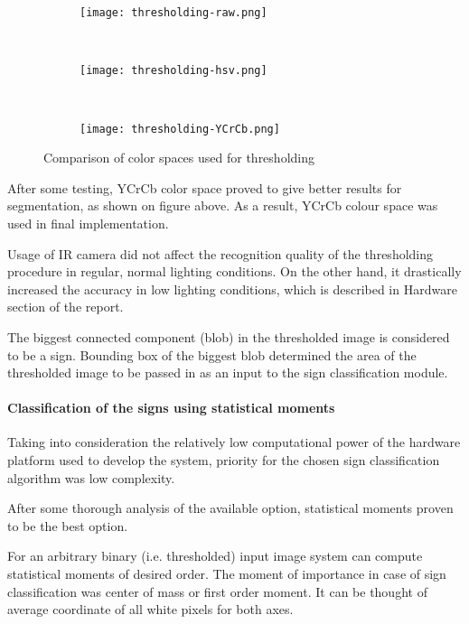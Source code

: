 \begin{figure}[th!]
	\centering
	\begin{subfigure}[b]{0.3\textwidth}
		\centering
		\texttt{[image: thresholding-raw.png]}
	\end{subfigure}
	~
	\begin{subfigure}[b]{0.3\textwidth}
		\centering
		\texttt{[image: thresholding-hsv.png]}
	\end{subfigure}
	~
	\begin{subfigure}[b]{0.3\textwidth}
		\centering
		\texttt{[image: thresholding-YCrCb.png]}
	\end{subfigure}
	\caption{Comparison of color spaces used for thresholding}
	\label{fig:color-spaces}
\end{figure}


After some testing, YCrCb color space proved to give better results for segmentation, as shown on figure above. As a result, YCrCb colour space was used in final implementation.

Usage of IR camera did not affect the recognition quality of the thresholding procedure in regular, normal lighting conditions. On the other hand, it drastically increased the accuracy in low lighting conditions, which is described in Hardware section of the report.

The biggest connected component (blob) in the thresholded image is considered to be a sign. Bounding box of the biggest blob determined the area of the thresholded image to be passed in as an input to the sign classification module. 

\paragraph{Classification of the signs using statistical moments}

Taking into consideration the relatively low computational power of the hardware platform used to develop the system, priority for the chosen sign classification algorithm was low complexity.

After some thorough analysis of the available option, statistical moments proven to be the best option.

For an arbitrary binary (i.e. thresholded) input image system can compute statistical moments of desired order. The moment of importance in case of sign classification was center of mass or first order moment. It can be thought of average coordinate of all white pixels for both axes.

